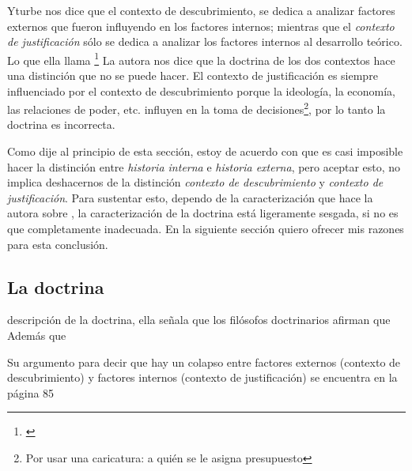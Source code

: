 Yturbe nos dice que el contexto de descubrimiento, se dedica a
analizar factores externos que fueron influyendo en los factores
internos; mientras que el \emph{contexto de justificación} sólo
se dedica a analizar los factores internos al desarrollo teórico.
Lo que ella llama \footnote{  \cite[p. 75]{Yturbe1995} } La
autora nos dice que la doctrina de los dos contextos hace una
distinción que no se puede hacer. El contexto de justificación es
siempre influenciado por el contexto de descubrimiento porque la
ideología, la economía, las relaciones de poder, etc. influyen en
la toma de decisiones\footnote{Por usar una caricatura: a quién
se le asigna presupuesto}, por lo tanto la doctrina es
incorrecta.

Como dije al principio de esta sección, estoy de acuerdo con que es casi
imposible hacer la distinción entre \emph{historia interna} e
\emph{historia externa}, pero aceptar esto, no implica deshacernos de la
distinción \emph{contexto de descubrimiento} y \emph{contexto de
justificación}. Para sustentar esto, dependo de la caracterización que hace
la autora sobre , la caracterización
de la doctrina está ligeramente sesgada, si no es que completamente
inadecuada. En la siguiente sección quiero ofrecer mis razones para esta
conclusión.

\subsection{La doctrina}

descripción de la doctrina, ella señala que los filósofos doctrinarios
afirman que  Además que 


Su argumento para decir que hay un colapso entre factores externos
(contexto de descubrimiento) y factores internos (contexto de
justificación) se encuentra en la página 85

